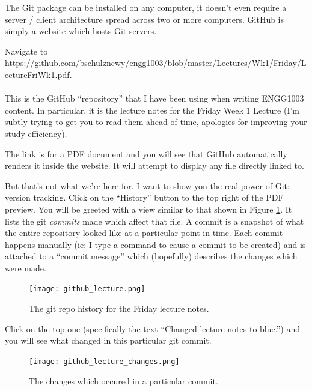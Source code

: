 \documentclass{lab}
\begin{document}
The Git package can be installed on any computer, it doesn't even require a server / client architecture spread across two or more computers. GitHub is simply a website which hosts Git servers.

\begin{task}{}{} Navigate to \url{https://github.com/bschulznewy/engg1003/blob/master/Lectures/Wk1/Friday/LectureFriWk1.pdf}.
\\ \\ 
This is the GitHub ``repository'' that I have been using when writing ENGG1003 content. In particular, it is the lecture notes for the Friday Week 1 Lecture (I'm subtly trying to get you to read them ahead of time, apologies for improving your study efficiency).
\end{task}

The link is for a PDF document and you will see that GitHub automatically renders it inside the website. It will attempt to display any file directly linked to.

But that's not what we're here for. I want to show you the real power of Git: version tracking. Click on the ``History'' button to the top right of the PDF preview. You will be greeted with a view similar to that shown in Figure \ref{fig:githistory}. It lists the git \textit{commits} made which affect that file. A commit is a snapshot of what the entire repository looked like at a particular point in time. Each commit happens manually (ie: I type a command to cause a commit to be created) and is attached to a ``commit message'' which (hopefully) describes the changes which were made.

\begin{figure}[H]
\begin{center}
\texttt{[image: github\_lecture.png]}
\end{center}
\caption{The git repo history for the Friday lecture notes.}\label{fig:githistory}
\end{figure}

Click on the top one (specifically the text ``Changed lecture notes to blue.'') and you will see what changed in this particular git commit.

\begin{figure}[H]
\begin{center}
\texttt{[image: github\_lecture\_changes.png]}
\end{center}
\caption{The changes which occured in a particular commit.}\label{fig:gitchanges}
\end{figure}
\end{document}
